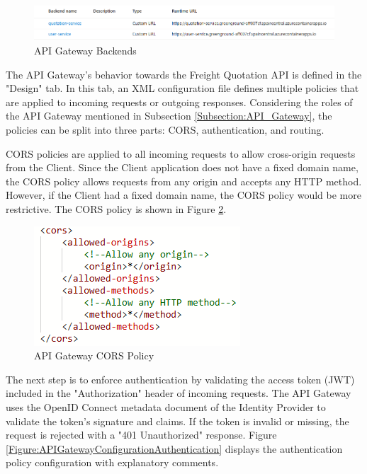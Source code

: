 \documentclass[12pt, reqno, oneside]{amsbook}
\theoremstyle{definition}
\theoremstyle{definition}
\numberwithin{section}{chapter}
\numberwithin{table}{chapter}
\numberwithin{figure}{chapter}
\begin{document}
\begin{figure}[H]
  \centering
  \includegraphics[width=0.9\linewidth]{images/APIGatewayBackends.png}
  \caption{\label{Figure:APIGatewayBackends}API Gateway Backends}
\end{figure}

The \ac{API} Gateway's behavior towards the Freight Quotation API is defined in the "Design" tab. In this tab, an \ac{XML} configuration file defines multiple policies that are applied to incoming requests or outgoing responses. Considering the roles of the \ac{API} Gateway mentioned in Subsection \ref{Subsection:API_Gateway}, the policies can be split into three parts: \Ac{CORS}, authentication, and routing.

\ac{CORS} policies are applied to all incoming requests to allow cross-origin requests from the Client. Since the Client application does not have a fixed domain name, the \ac{CORS} policy allows requests from any origin and accepts any \ac{HTTP} method. However, if the Client had a fixed domain name, the \ac{CORS} policy would be more restrictive. The \ac{CORS} policy is shown in Figure \ref{Figure:APIGatewayConfigurationCORS}.

\begin{figure}[H]
  \centering
  \includegraphics[width=0.4\linewidth]{images/APIGatewayConfigurationCORS.png}
  \caption{\label{Figure:APIGatewayConfigurationCORS}API Gateway \ac{CORS} Policy}
\end{figure}

The next step is to enforce authentication by validating the access token (\ac{JWT}) included in the "Authorization" header of incoming requests. The \ac{API} Gateway uses the OpenID Connect metadata document of the Identity Provider to validate the token's signature and claims. If the token is invalid or missing, the request is rejected with a "401 Unauthorized" response. Figure \ref{Figure:APIGatewayConfigurationAuthentication} displays the authentication policy configuration with explanatory comments.
\end{document}
